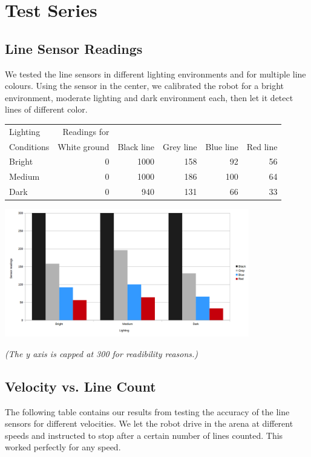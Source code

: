 \documentclass[12pt]{article}
\begin{document}
\lstset{language=C++}

\section*{Test Series}
\subsection*{Line Sensor Readings}
We tested the line sensors in different lighting environments and for multiple line colours.
Using the sensor in the center, we calibrated the robot for a bright environment, moderate lighting and dark environment each, then let it detect lines of different color.

\begin{tabular}{ | l || r | r | r | r | r | }
\hline
Lighting & Readings for & & & & \\
Conditions & White ground & Black line & Grey line & Blue line & Red line \\ \hline
Bright & 0 & 1000 & 158 & 92 & 56\\ \hline
Medium & 0 & 1000 & 186 & 100 & 64\\ \hline
Dark & 0 & 940 & 131 & 66 & 33\\
\hline
\end{tabular}

\begin{center}

\includegraphics[width = 0.8\textwidth]{images/chart_brightness.png}


\textit{(The y axis is capped at 300 for readibility reasons.)}

\end{center}

\subsection*{Velocity vs. Line Count}
The following table contains our results from testing the accuracy of the line sensors for different velocities. We let the robot drive in the arena at different speeds and instructed to stop after a certain number of lines counted. This worked perfectly for any speed.
\end{document}
